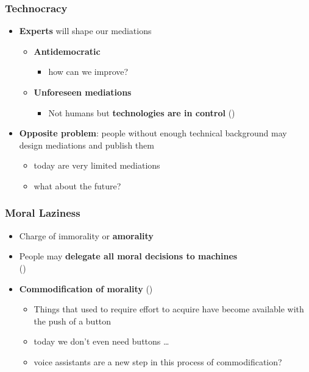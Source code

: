 \documentclass{beamer}
\begin{document}
\begin{frame}
	\frametitle{Technocracy}

	\begin{itemize}
		\item \textbf{Experts} will shape our mediations
		\smallskip
		\begin{itemize}
			\item \textbf{Antidemocratic}
			\begin{itemize}
				\item how can we improve?
			\end{itemize}
			\smallskip
			\item \textbf{Unforeseen mediations}
			\begin{itemize}
				\item Not humans but \textbf{technologies are in control} (\cite{verbeek2011moralizing})
			\end{itemize}
		\end{itemize}
	     \bigskip
		\item \textbf{Opposite problem}: people without enough technical background may design mediations and publish them
		\smallskip
		\begin{itemize}
			\item today are very limited mediations
			\smallskip
			\item what about the future?
		\end{itemize}
	\end{itemize}
\end{frame}

\begin{frame}
\frametitle{Moral Laziness}
\begin{itemize}
	\item Charge of immorality or \textbf{amorality}
	\medskip
	\item People may \textbf{delegate all moral decisions to machines} \\(\cite{verbeek2011moralizing})
	\medskip
	\item \textbf{Commodification of morality} (\cite{borgmann1984technology})
		 \begin{itemize}
		 	\item Things that used to require effort to acquire have become
available with the push of a button
		 	\smallskip
		 	\item today we don't even need buttons \dots
		 	\smallskip
		 	\item voice assistants are a new step in this process of commodification?
		 \end{itemize}
\end{itemize}
\end{frame}
\end{document}
